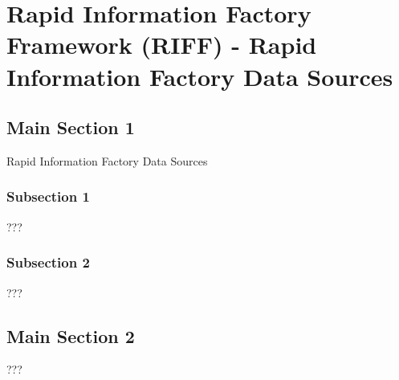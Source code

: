 
\chapter{Rapid Information Factory Framework (RIFF) - Rapid Information Factory Data Sources} %

\label{Chapter45} %



\section{Main Section 1}

Rapid Information Factory Data Sources

\subsection{Subsection 1}

???


\subsection{Subsection 2}

???


\section{Main Section 2}

???
